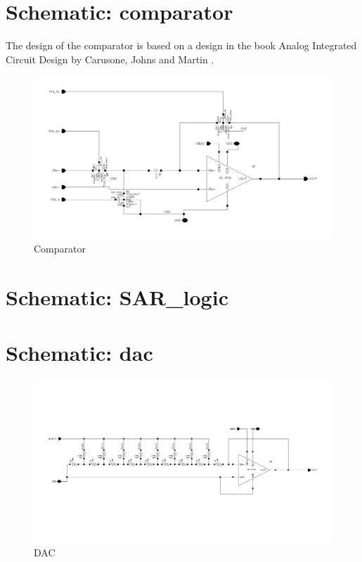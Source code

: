 \documentclass[english, a4paper,11pt]{article}
\begin{document}
\section*{Schematic: comparator}
The design of the comparator is based on a design in the book Analog Integrated Circuit Design by Carusone, Johns and Martin \cite{Analog-integrated}. 
\begin{figure}[!ht]
 \centering
   \includegraphics[width=\textwidth]{img/comparator}
   \caption{Comparator}
   \label{comparator}
\end{figure}
\section*{Schematic: SAR\_logic}
\section*{Schematic: dac}
\begin{figure}[!ht]
 \centering
   \includegraphics[width=\textwidth]{img/dac}
   \caption{DAC}
   \label{dac}
\end{figure}
\end{document}
